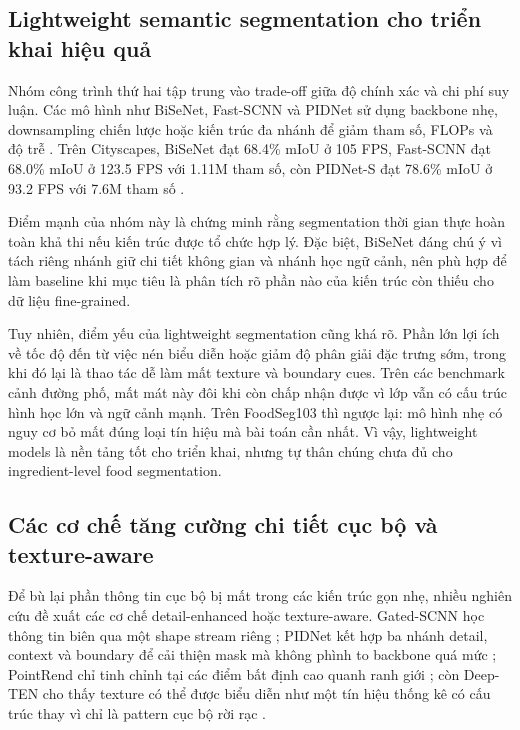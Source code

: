\subsection{Lightweight semantic segmentation cho triển khai hiệu quả}

Nhóm công trình thứ hai tập trung vào trade-off giữa độ chính xác và chi phí suy luận. Các mô hình như BiSeNet, Fast-SCNN và PIDNet sử dụng backbone nhẹ, downsampling chiến lược hoặc kiến trúc đa nhánh để giảm tham số, FLOPs và độ trễ \cite{bisenet,poudel2019fastscnn,xu2023pidnet}. Trên Cityscapes, BiSeNet đạt 68.4\% mIoU ở 105 FPS, Fast-SCNN đạt 68.0\% mIoU ở 123.5 FPS với 1.11M tham số, còn PIDNet-S đạt 78.6\% mIoU ở 93.2 FPS với 7.6M tham số \cite{bisenet,poudel2019fastscnn,xu2023pidnet}.

Điểm mạnh của nhóm này là chứng minh rằng segmentation thời gian thực hoàn toàn khả thi nếu kiến trúc được tổ chức hợp lý. Đặc biệt, BiSeNet đáng chú ý vì tách riêng nhánh giữ chi tiết không gian và nhánh học ngữ cảnh, nên phù hợp để làm baseline khi mục tiêu là phân tích rõ phần nào của kiến trúc còn thiếu cho dữ liệu fine-grained.

Tuy nhiên, điểm yếu của lightweight segmentation cũng khá rõ. Phần lớn lợi ích về tốc độ đến từ việc nén biểu diễn hoặc giảm độ phân giải đặc trưng sớm, trong khi đó lại là thao tác dễ làm mất texture và boundary cues. Trên các benchmark cảnh đường phố, mất mát này đôi khi còn chấp nhận được vì lớp vẫn có cấu trúc hình học lớn và ngữ cảnh mạnh. Trên FoodSeg103 thì ngược lại: mô hình nhẹ có nguy cơ bỏ mất đúng loại tín hiệu mà bài toán cần nhất. Vì vậy, lightweight models là nền tảng tốt cho triển khai, nhưng tự thân chúng chưa đủ cho ingredient-level food segmentation.

\subsection{Các cơ chế tăng cường chi tiết cục bộ và texture-aware}

Để bù lại phần thông tin cục bộ bị mất trong các kiến trúc gọn nhẹ, nhiều nghiên cứu đề xuất các cơ chế detail-enhanced hoặc texture-aware. Gated-SCNN học thông tin biên qua một shape stream riêng \cite{takikawa2019gatedscnn}; PIDNet kết hợp ba nhánh detail, context và boundary để cải thiện mask mà không phình to backbone quá mức \cite{xu2023pidnet}; PointRend chỉ tinh chỉnh tại các điểm bất định cao quanh ranh giới \cite{kirillov2020pointrend}; còn Deep-TEN cho thấy texture có thể được biểu diễn như một tín hiệu thống kê có cấu trúc thay vì chỉ là pattern cục bộ rời rạc \cite{zhang2017deepten}.

